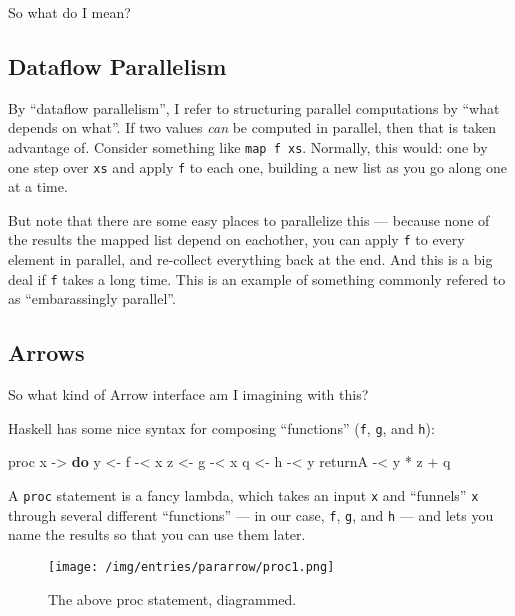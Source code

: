 \documentclass[]{article}
\newenvironment{Shaded}{}{}
\newcommand{\KeywordTok}[1]{\textcolor[rgb]{0.00,0.44,0.13}{\textbf{{#1}}}}
\newcommand{\OtherTok}[1]{\textcolor[rgb]{0.00,0.44,0.13}{{#1}}}
\newcommand{\FunctionTok}[1]{\textcolor[rgb]{0.02,0.16,0.49}{{#1}}}
\newcommand{\NormalTok}[1]{{#1}}
\begin{document}
So what do I mean?

\subsection{Dataflow Parallelism}\label{dataflow-parallelism}

By ``dataflow parallelism'', I refer to structuring parallel computations by
``what depends on what''. If two values \emph{can} be computed in parallel, then
that is taken advantage of. Consider something like \texttt{map\ f\ xs}.
Normally, this would: one by one step over \texttt{xs} and apply \texttt{f} to
each one, building a new list as you go along one at a time.

But note that there are some easy places to parallelize this --- because none of
the results the mapped list depend on eachother, you can apply \texttt{f} to
every element in parallel, and re-collect everything back at the end. And this
is a big deal if \texttt{f} takes a long time. This is an example of something
commonly refered to as ``embarassingly parallel''.

\subsection{Arrows}\label{arrows}

So what kind of Arrow interface am I imagining with this?

Haskell has some nice syntax for composing ``functions'' (\texttt{f},
\texttt{g}, and \texttt{h}):

\begin{Shaded}
\begin{Highlighting}[]
\NormalTok{proc x }\OtherTok{->} \KeywordTok{do}
    \NormalTok{y }\OtherTok{<-} \NormalTok{f }\FunctionTok{-<} \NormalTok{x}
    \NormalTok{z }\OtherTok{<-} \NormalTok{g }\FunctionTok{-<} \NormalTok{x}
    \NormalTok{q }\OtherTok{<-} \NormalTok{h }\FunctionTok{-<} \NormalTok{y}
    \NormalTok{returnA }\FunctionTok{-<} \NormalTok{y }\FunctionTok{*} \NormalTok{z }\FunctionTok{+} \NormalTok{q}
\end{Highlighting}
\end{Shaded}

A \texttt{proc} statement is a fancy lambda, which takes an input \texttt{x} and
``funnels'' \texttt{x} through several different ``functions'' --- in our case,
\texttt{f}, \texttt{g}, and \texttt{h} --- and lets you name the results so that
you can use them later.

\begin{figure}[htbp]
\centering
\texttt{[image: /img/entries/pararrow/proc1.png]}
\caption{The above proc statement, diagrammed.}
\end{figure}
\end{document}
